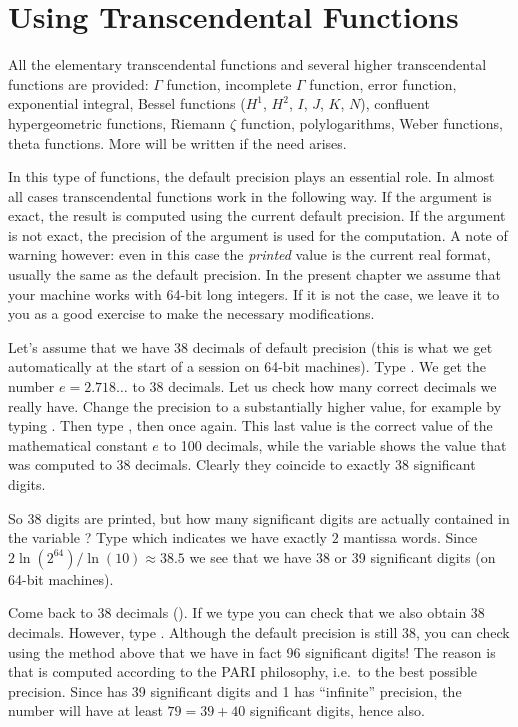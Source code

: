 \section{Using Transcendental Functions}

All the elementary transcendental functions and several higher transcendental
functions are provided: $\Gamma$ function, incomplete $\Gamma$ function, error
function, exponential integral, Bessel functions ($H^1$, $H^2$, $I$, $J$,
$K$, $N$), confluent hypergeometric functions, Riemann $\zeta$ function,
polylogarithms, Weber functions, theta functions. More will be written if the
need arises.

In this type of functions, the default precision plays an essential role.
In almost all cases transcendental functions work in the following way.
If the argument is exact, the result is computed using the current
default precision. If the argument is not exact, the precision of the
argument is used for the computation. A note of warning however: even in this
case the \emph{printed} value is the current real format, usually the
same as the default precision. In the present chapter we assume that your
machine works with 64-bit long integers. If it is not the case, we leave it
to you as a good exercise to make the necessary modifications.

Let's assume that we have 38 decimals of default precision (this is what we
get automatically at the start of a  session on 64-bit machines). Type
. We get the number $e=2.718\dots$ to 38 decimals. Let us check
how many correct decimals we really have. Change the precision to a
substantially higher value, for example by typing . Then type
, then  once again. This last value is the correct value
of the mathematical constant $e$ to 100 decimals, while the variable 
shows the value that was computed to 38 decimals. Clearly they coincide to
exactly 38 significant digits.

So 38 digits are printed, but how many significant digits are actually
contained in the variable ? Type  which indicates we have
exactly $2$ mantissa words. Since $2\ln(2^{64}) / \ln(10)\approx38.5$ we see
that we have 38 or 39 significant digits (on 64-bit machines).

\smallskip
Come back to 38 decimals (). If we type 
you can check that we also obtain 38 decimals. However, type
. Although the default precision is still 38,
you can check using the method above that we have in fact 96 significant
digits! The reason is that  is computed according to the PARI
philosophy, i.e.~to the best possible precision. Since  has 39
significant digits and 1 has ``infinite'' precision, the number  will have at least $79=39+40$ significant digits, hence  also.


